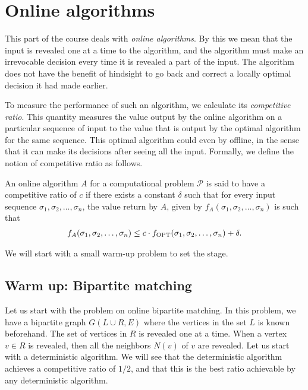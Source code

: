 \chapter{Online algorithms}

This part of the course deals with \emph{online algorithms}. By this we mean that the input is revealed one at a time to the algorithm, and the algorithm must make an irrevocable decision every time it is revealed a part of the input. The algorithm does not have the benefit of hindsight to go back and correct a locally optimal decision it had made earlier. 

To measure the performance of such an algorithm, we calculate its \emph{competitive ratio}. This quantity measures the value output by the online algorithm on a particular sequence of input to the value that is output by the optimal algorithm for the same sequence. This optimal algorithm could even by offline, in the sense that it can make its decisions after seeing all the input. Formally, we define the notion of competitive ratio as follows.

\begin{definition}
	An online algorithm $A$ for a computational problem $\mathcal{P}$ is said to have a competitive ratio of $c$ if there exists a constant $\delta$ such that for every input sequence $\sigma_1, \sigma_2, \ldots, \sigma_n$, the value return by $A$, given by $f_A(\sigma_1, \sigma_2, \ldots, \sigma_n)$ is such that
	\begin{align*}
		f_A(\sigma_1,\sigma_2,\ldots,\sigma_n) \leq c\cdot f_{\operatorname{OPT}}(\sigma_1,\sigma_2,\ldots,\sigma_n) + \delta.
	\end{align*}
	\label{def:comp-ratio}
\end{definition}

We will start with a small warm-up problem to set the stage.

\section{Warm up: Bipartite matching}

Let us start with the problem on online bipartite matching. In this problem, we have a bipartite graph $G(L\cup R, E)$ where the vertices in the set $L$ is known beforehand. The set of vertices in $R$ is revealed one at a time. When a vertex $v \in R$ is revealed, then all the neighbors $N(v)$ of $v$ are revealed. Let us start with a deterministic algorithm. We will see that the deterministic algorithm achieves a competitive ratio of $1/2$, and that this is the best ratio achievable by any deterministic algorithm.

